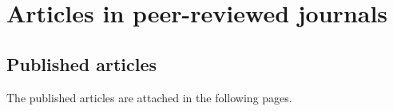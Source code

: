 \chapter{Articles in peer-reviewed journals}
            
\section*{Published articles}


The published articles are attached in the following pages.

\begin{refsection}%
\nocite{*}
\printbibliography[keyword=publicado,heading=none] %
\end{refsection}%







%